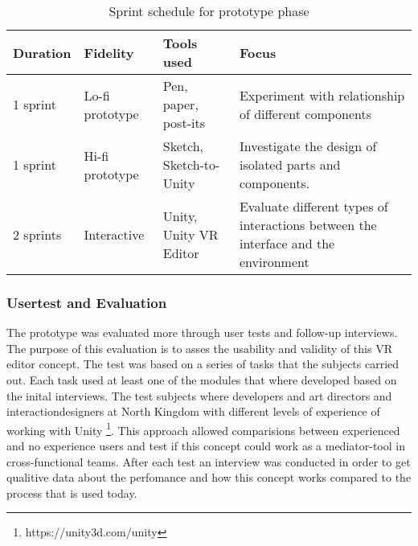 \begin{table}[]
  \centering
  \caption{Sprint schedule for prototype phase}
  \label{table:sprints}
  \begin{tabular}{|l|l|l| p{5cm}|}
     \hline
    \textbf{Duration} & \textbf{Fidelity} & \textbf{Tools used} & \textbf{Focus} \\\hline
    1 sprint                         & Lo-fi prototype  & Pen, paper, post-its    & Experiment with relationship of different components                               \\\hline
    1 sprint                        & Hi-fi prototype & Sketch, Sketch-to-Unity & Investigate the design of isolated parts and components.                           \\\hline
    2 sprints                 & Interactive   & Unity, Unity VR Editor  & Evaluate different types of interactions between the interface and the environment  \\\hline
  \end{tabular}
\end{table}

\subsubsection{Usertest and Evaluation}
The prototype was evaluated more through user tests and follow-up interviews. The purpose of this evaluation is to asses the usability and validity of this VR editor concept. The test was based on a series of tasks that the subjects carried out. Each task used at least one of the modules that where developed based on the inital interviews. The test subjects where developers and art directors and interactiondesigners at North Kingdom with different levels of experience of working with Unity \footnote{https://unity3d.com/unity}. This approach allowed comparisions between experienced and no experience users and test if this concept could work as a mediator-tool in cross-functional teams. After each test an interview was conducted in order to get qualitive data about the perfomance and how this concept works compared to the process that is used today.
